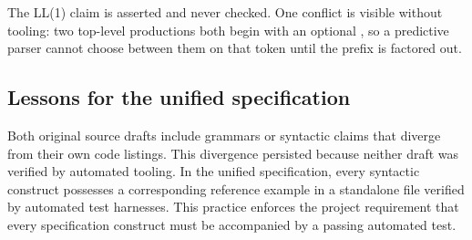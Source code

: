 The LL(1) claim is asserted and never checked. One conflict is visible
without tooling: two top-level productions both begin with an optional
, so a predictive parser cannot choose between them on that token
until the prefix is factored out.

\subsection{Lessons for the unified specification}

Both original source drafts include grammars or syntactic claims that diverge
from their own code listings. This divergence persisted because neither draft
was verified by automated tooling. In the unified specification, every
syntactic construct possesses a corresponding reference example in a standalone
file verified by automated test harnesses. This practice enforces the project
requirement that every specification construct must be accompanied by a
passing automated test.
